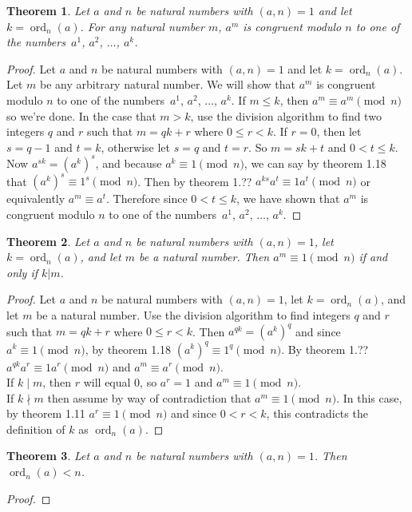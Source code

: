 \documentclass[12pt,leqno]{article}
\numberwithin{equation}{section}
\newtheorem{thm}{Theorem}[section]
\theoremstyle{definition}
\newcommand{\ord}{\operatorname{ord}}
\begin{document}
\begin{thm}
Let $a$ and $n$ be natural numbers with $(a, n) = 1$ and let $k =
\ord_n(a)$.  For any natural number $m$, $a^m$ is congruent modulo
$n$ to one of the numbers~$a^1$, $a^2$, $\hdots$, $a^k$.
\end{thm}
\begin{proof}[Proof]
Let $a$ and $n$ be natural numbers with $(a, n) = 1$ and let $k = \ord_n(a)$.  Let $m$ be any arbitrary natural number.  We will show that $a^m$ is congruent modulo $n$ to one of the numbers~$a^1$, $a^2$, $\hdots$, $a^k$.  If $m \leq k$, then $a^m \equiv a^m \pmod{n}$ so we're done.  In the case that $m > k$, use the division algorithm to find two integers $q$ and $r$ such that $m = qk + r$ where $0 \leq r < k$.  If $r = 0$, then let $s = q - 1$ and $t = k$, otherwise let $s = q$ and $t = r$. So $m = sk + t$ and $0 < t \leq k$.   Now $a^{sk} = (a^k)^s$, and because $a^k \equiv 1 \pmod{n}$, we can say by theorem 1.18 that $(a^k)^s \equiv 1^s \pmod{n}$.  Then by theorem 1.??  $a^{ks}a^t \equiv 1a^t \pmod{n}$ or equivalently $a^m \equiv a^t$.  Therefore since $0 < t \leq k$, we have shown that $a^m$ is congruent modulo $n$ to one of the numbers~$a^1$, $a^2$, $\hdots$, $a^k$.
\end{proof}


\begin{thm}
Let $a$ and $n$ be natural numbers with $(a, n) = 1$, let $k =
\ord_n(a)$, and let $m$ be a natural number.  Then $a^m \equiv 1
\pmod{n}$ if and only if $k|m$.
\end{thm}
\begin{proof}[Proof]
Let $a$ and $n$ be natural numbers with $(a, n) = 1$, let $k = \ord_n(a)$, and let $m$ be a natural number.  Use the division algorithm to find integers $q$ and $r$ such that $m = qk + r$ where $0 \leq r < k$.  Then $a^{qk} = (a^k)^q$ and since $a^k \equiv 1 \pmod{n}$,  by theorem 1.18 $(a^k)^q \equiv 1^q \pmod{n}$.  By theorem 1.??  $a^{qk}a^r \equiv 1a^r \pmod{n}$ and $a^m \equiv a^r \pmod{n}$.\\

If $k \mid m$, then $r$ will equal $0$, so $a^r = 1$ and $a^m \equiv 1 \pmod{n}$.\\

If $k \nmid m$ then assume by way of contradiction that $a^m \equiv 1 \pmod{n}$.  In this case, by theorem 1.11 $a^r \equiv 1 \pmod{n}$ and since $0 < r < k$, this contradicts the definition of $k$ as $\ord_n(a)$.
\end{proof}

\begin{thm}
Let $a$ and $n$ be natural numbers with $(a, n) = 1$. Then
$\ord_n(a) < n$.
\end{thm}
\begin{proof}[Proof]
\end{proof}
\end{document}
